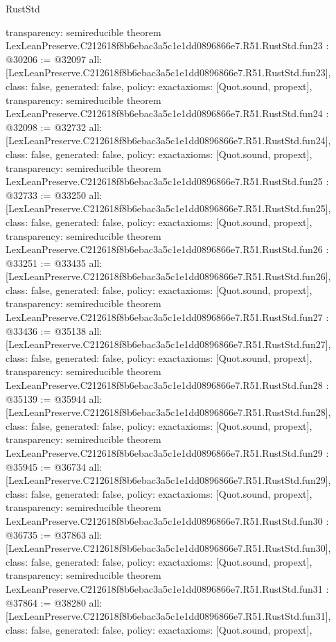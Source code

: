 \begin{lexlean}{RustStd}
\begin{coremodule}
{  transparency: semireducible
}
theorem LexLeanPreserve.C212618f8b6ebac3a5c1e1dd0896866e7.R51.RustStd.fun23 : @30206 := @32097 {
  all: [LexLeanPreserve.C212618f8b6ebac3a5c1e1dd0896866e7.R51.RustStd.fun23],
  class: false,
  generated: false,
  policy: exact{axioms: [Quot.sound, propext]},
  transparency: semireducible
}
theorem LexLeanPreserve.C212618f8b6ebac3a5c1e1dd0896866e7.R51.RustStd.fun24 : @32098 := @32732 {
  all: [LexLeanPreserve.C212618f8b6ebac3a5c1e1dd0896866e7.R51.RustStd.fun24],
  class: false,
  generated: false,
  policy: exact{axioms: [Quot.sound, propext]},
  transparency: semireducible
}
theorem LexLeanPreserve.C212618f8b6ebac3a5c1e1dd0896866e7.R51.RustStd.fun25 : @32733 := @33250 {
  all: [LexLeanPreserve.C212618f8b6ebac3a5c1e1dd0896866e7.R51.RustStd.fun25],
  class: false,
  generated: false,
  policy: exact{axioms: [Quot.sound, propext]},
  transparency: semireducible
}
theorem LexLeanPreserve.C212618f8b6ebac3a5c1e1dd0896866e7.R51.RustStd.fun26 : @33251 := @33435 {
  all: [LexLeanPreserve.C212618f8b6ebac3a5c1e1dd0896866e7.R51.RustStd.fun26],
  class: false,
  generated: false,
  policy: exact{axioms: [Quot.sound, propext]},
  transparency: semireducible
}
theorem LexLeanPreserve.C212618f8b6ebac3a5c1e1dd0896866e7.R51.RustStd.fun27 : @33436 := @35138 {
  all: [LexLeanPreserve.C212618f8b6ebac3a5c1e1dd0896866e7.R51.RustStd.fun27],
  class: false,
  generated: false,
  policy: exact{axioms: [Quot.sound, propext]},
  transparency: semireducible
}
theorem LexLeanPreserve.C212618f8b6ebac3a5c1e1dd0896866e7.R51.RustStd.fun28 : @35139 := @35944 {
  all: [LexLeanPreserve.C212618f8b6ebac3a5c1e1dd0896866e7.R51.RustStd.fun28],
  class: false,
  generated: false,
  policy: exact{axioms: [Quot.sound, propext]},
  transparency: semireducible
}
theorem LexLeanPreserve.C212618f8b6ebac3a5c1e1dd0896866e7.R51.RustStd.fun29 : @35945 := @36734 {
  all: [LexLeanPreserve.C212618f8b6ebac3a5c1e1dd0896866e7.R51.RustStd.fun29],
  class: false,
  generated: false,
  policy: exact{axioms: [Quot.sound, propext]},
  transparency: semireducible
}
theorem LexLeanPreserve.C212618f8b6ebac3a5c1e1dd0896866e7.R51.RustStd.fun30 : @36735 := @37863 {
  all: [LexLeanPreserve.C212618f8b6ebac3a5c1e1dd0896866e7.R51.RustStd.fun30],
  class: false,
  generated: false,
  policy: exact{axioms: [Quot.sound, propext]},
  transparency: semireducible
}
theorem LexLeanPreserve.C212618f8b6ebac3a5c1e1dd0896866e7.R51.RustStd.fun31 : @37864 := @38280 {
  all: [LexLeanPreserve.C212618f8b6ebac3a5c1e1dd0896866e7.R51.RustStd.fun31],
  class: false,
  generated: false,
  policy: exact{axioms: [Quot.sound, propext]},
}
\end{coremodule}
\end{lexlean}

